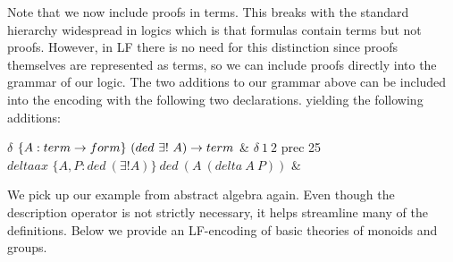 \documentclass{article}
\begin{document}
Note that we now include proofs in terms. This breaks with the standard hierarchy widespread in logics which is that formulas contain terms but not proofs. However, in LF there is no need for this distinction since proofs themselves are represented as terms, so we can include proofs directly into the grammar of our logic. The two additions to our grammar above can be included into the encoding with the following two declarations. yielding the following additions:\\
\begin{twelfsig}
$\delta$ \tcolon $\{A: term \rightarrow form \}\ (ded\ \exists!\ A) \rightarrow term$  & $  \delta\ 1\ 2$ prec 25 \\
$deltaax$ \tcolon $\{A,P: ded\ (\exists! A)\}\ ded\ (A\ (delta\ A\ P))$ & \\
\end{twelfsig}


We pick up our example from abstract algebra again. Even though the description operator is not strictly necessary, it helps streamline many of the definitions. Below we provide an LF-encoding of basic theories of monoids and groups. 
\end{document}
